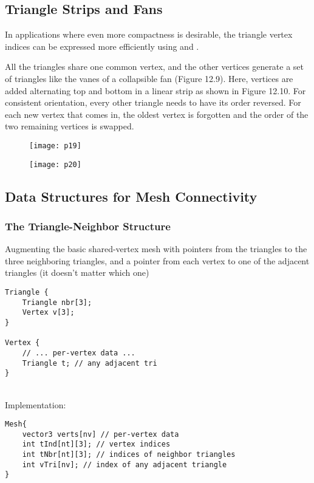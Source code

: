 \documentclass[11pt]{article}
\numberwithin{equation}{section}
\begin{document}
\subsection{Triangle Strips and Fans}
In applications where even more compactness is desirable, the triangle vertex indices can be expressed more efficiently using  and .

All the triangles share one common vertex, and the other vertices generate a set of triangles like the vanes of a collapsible fan (Figure 12.9). 
Here, vertices are added alternating top and bottom in a linear strip as shown in Figure 12.10.  For consistent orientation, every other triangle needs to have its order reversed. For each new vertex that comes in, the oldest vertex is forgotten and the order of the two remaining vertices is swapped.
\begin{figure}[H]
	\centering
	\texttt{[image: p19]}
\end{figure}
\begin{figure}[H]
	\centering
	\texttt{[image: p20]}
\end{figure}
\noindent {}

\subsection{Data Structures for Mesh Connectivity}
\subsubsection{The Triangle-Neighbor Structure}
Augmenting the basic shared-vertex mesh with pointers from the triangles to the three neighboring triangles, and a pointer from each vertex to one of the adjacent triangles (it doesn't matter which one)
\begin{framed}
\begin{verbatim}
Triangle {
	Triangle nbr[3];
	Vertex v[3];
}

Vertex {
	// ... per-vertex data ...
	Triangle t; // any adjacent tri
}
\end{verbatim}
\end{framed}
\noindent {}\\
Implementation:
\begin{framed}
\begin{verbatim}
Mesh{
	vector3 verts[nv] // per-vertex data 
	int tInd[nt][3]; // vertex indices
	int tNbr[nt][3]; // indices of neighbor triangles
	int vTri[nv]; // index of any adjacent triangle
}
\end{verbatim}
\end{framed}
\end{document}
